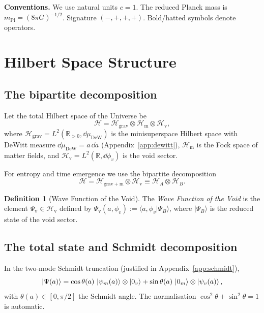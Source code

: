 \documentclass[12pt,a4paper]{article}
\theoremstyle{plain}
\theoremstyle{definition}
\newtheorem{definition}[theorem]{Definition}
\newcommand{\Hil}{\mathscr{H}}
\newcommand{\HilM}{\mathscr{H}_{\mathrm{m}}}
\newcommand{\HilV}{\mathscr{H}_{\mathrm{v}}}
\newcommand{\Psiv}{\Psi_{\mathrm{v}}}
\newcommand{\Mpl}{m_{\mathrm{Pl}}}
\begin{document}
\medskip
\noindent\textbf{Conventions.}
We use natural units $c = 1$. The reduced Planck mass is
$\Mpl = (8\pi G)^{-1/2}$. Signature $(-,+,+,+)$.
Bold/hatted symbols denote operators.

\section{Hilbert Space Structure}
\label{sec:hilbert}

\subsection{The bipartite decomposition}

Let the total Hilbert space of the Universe be
\begin{equation}
  \Hil = \Hil_{\mathrm{grav}} \otimes \HilM \otimes \HilV,
  \label{eq:hilbert_total}
\end{equation}
where $\Hil_{\mathrm{grav}} = L^2(\mathbb{R}_{>0},\dd\mu_{\mathrm{DeW}})$
is the minisuperspace Hilbert space with DeWitt measure
$\dd\mu_{\mathrm{DeW}} = a\,\dd a$ (Appendix~\ref{app:dewitt}),
$\HilM$ is the Fock space of matter fields, and
$\HilV = L^2(\mathbb{R},\dd\phi_v)$ is the void sector.

For entropy and time emergence we use the bipartite decomposition
\begin{equation}
  \Hil = \Hil_{\mathrm{grav}+\mathrm{m}} \otimes \HilV
       \equiv \Hil_A \otimes \Hil_B.
  \label{eq:bipartite}
\end{equation}

\begin{definition}[Wave Function of the Void]
The \emph{Wave Function of the Void} is the element
$\Psiv \in \HilV$ defined by
$\Psiv(a,\phi_v) := \langle a,\phi_v|\Psi_B\rangle$,
where $|\Psi_B\rangle$ is the reduced state of the void sector.
\end{definition}

\subsection{The total state and Schmidt decomposition}

In the two-mode Schmidt truncation (justified in Appendix~\ref{app:schmidt}),
\begin{equation}
  \ket{\Psi(a)} = \cos\theta(a)\,\ket{\psi_m(a)}\otimes\ket{0_v}
                + \sin\theta(a)\,\ket{0_m}\otimes\ket{\psi_v(a)},
  \label{eq:schmidt_2mode}
\end{equation}
with $\theta(a)\in[0,\pi/2]$ the Schmidt angle.
The normalisation $\cos^2\theta + \sin^2\theta = 1$ is automatic.
\end{document}
